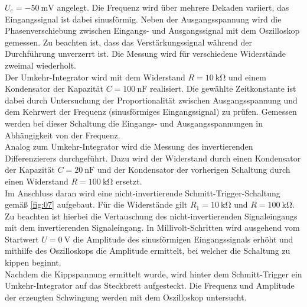 $U_e = -\SI{50}{\milli\volt}$ angelegt. Die Frequenz wird über mehrere Dekaden
variiert, das Eingangssignal ist dabei sinusförmig. Neben der Ausgangsspannung
wird die Phasenverschiebung zwischen Eingangs- und Ausgangssignal mit dem
Oszilloskop gemessen. Zu beachten ist, dass das Verstärkungssignal während der
Durchführung unverzerrt ist. Die Messung wird für verschiedene Widerstände
zweimal wiederholt. \\
\noindent Der Umkehr-Integrator wird mit dem Widerstand $R = \SI{10}{\kilo\ohm}$
und einem Kondensator der Kapazität $C = \SI{100}{\nano\farad}$ realisiert.
Die gewählte Zeitkonstante ist dabei durch Untersuchung der Proportionalität
zwischen Ausgangsspannung und dem Kehrwert der Frequenz (sinusförmiges
Eingangssignal) zu prüfen. Gemessen werden bei dieser Schaltung die Eingangs-
und Ausgangsspannungen in Abhängigkeit von der Frequenz. \\
\noindent Analog zum Umkehr-Integrator wird die Messung des invertierenden
Differenzierers durchgeführt. Dazu wird der Widerstand durch einen Kondensator
der Kapazität $C = \SI{20}{\nano\farad}$ und der Kondensator der vorherigen
Schaltung durch einen Widerstand $R = \SI{100}{\kilo\ohm}$ ersetzt. \\
\noindent Im Anschluss daran wird eine nicht-invertierende
Schmitt-Trigger-Schaltung gemäß \autoref{fig:07} aufgebaut. Für die
Widerstände gilt $R_1 = \SI{10}{\kilo\ohm}$ und $R = \SI{100}{\kilo\ohm}$.
Zu beachten ist hierbei die Vertauschung des nicht-invertierenden Signaleingangs
mit dem invertierenden Signaleingang. In Millivolt-Schritten wird ausgehend vom
Startwert $U = \SI{0}{\volt}$ die Amplitude des sinusförmigen Eingangssignals
erhöht und mithilfe des Oszilloskops die Amplitude ermittelt, bei welcher
die Schaltung zu kippen beginnt. \\
\noindent Nachdem die Kippspannung ermittelt wurde, wird hinter dem
Schmitt-Trigger ein Umkehr-Integrator auf das Steckbrett aufgesteckt. Die
Frequenz und Amplitude der erzeugten Schwingung werden mit dem Oszilloskop
untersucht.
